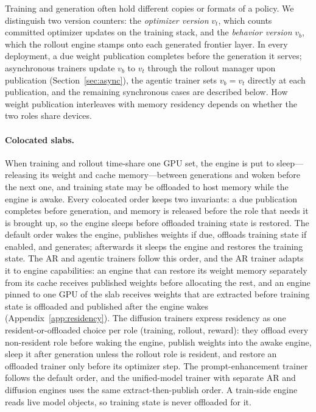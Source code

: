 \documentclass[10pt]{article}
\begin{document}
Training and generation often hold different copies or formats of a policy.
We distinguish two version counters: the \emph{optimizer version} $v_t$, which counts committed optimizer updates on the training stack, and the \emph{behavior version} $v_b$, which the rollout engine stamps onto each generated frontier layer.
In every deployment, a due weight publication completes before the generation it serves; asynchronous trainers update $v_b$ to $v_t$ through the rollout manager upon publication (Section~\ref{sec:async}), the agentic trainer sets $v_b = v_t$ directly at each publication, and the remaining synchronous cases are described below.
How weight publication interleaves with memory residency depends on whether the two roles share devices.

\paragraph{Colocated slabs.}
When training and rollout time-share one GPU set, the engine is put to sleep---releasing its weight and cache memory---between generations and woken before the next one, and training state may be offloaded to host memory while the engine is awake.
Every colocated order keeps two invariants: a due publication completes before generation, and memory is released before the role that needs it is brought up, so the engine sleeps before offloaded training state is restored.
The default order wakes the engine, publishes weights if due, offloads training state if enabled, and generates; afterwards it sleeps the engine and restores the training state.
The AR and agentic trainers follow this order, and the AR trainer adapts it to engine capabilities: an engine that can restore its weight memory separately from its cache receives published weights before allocating the rest, and an engine pinned to one GPU of the slab receives weights that are extracted before training state is offloaded and published after the engine wakes (Appendix~\ref{app:residency}).
The diffusion trainers express residency as one resident-or-offloaded choice per role (training, rollout, reward): they offload every non-resident role before waking the engine, publish weights into the awake engine, sleep it after generation unless the rollout role is resident, and restore an offloaded trainer only before its optimizer step.
The prompt-enhancement trainer follows the default order, and the unified-model trainer with separate AR and diffusion engines uses the same extract-then-publish order.
A train-side engine reads live model objects, so training state is never offloaded for it.
\end{document}
